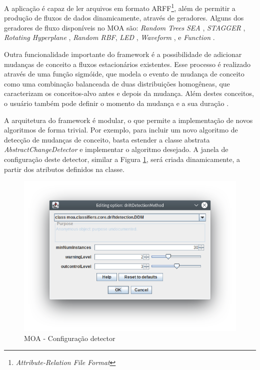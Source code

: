 \documentclass[msc, classic, a4paper]{ufbathesis}
\begin{document}
A aplicação é capaz de ler arquivos em formato ARFF\footnote{\textit{Attribute-Relation File Format}}, além de permitir a produção de fluxos de dados dinamicamente, através de geradores.
Alguns dos geradores de fluxo disponíveis no MOA são:
\textit{Random Trees} \cite{Domingos:2000:MHD:347090.347107}
\textit{SEA} \cite{Street:2001:SEA:502512.502568},
\textit{STAGGER} \cite{Schlimmer1986},
\textit{Rotating Hyperplane} \cite{Wang:2003:MCD:956750.956778},
\textit{Random RBF},
\textit{LED} \cite{Gama:2003:ADT:956750.956813},
\textit{Waveform} \cite{Gama:2003:ADT:956750.956813},
 e \textit{Function} \cite{Jin:2003:EDT:956750.956821}.

Outra funcionalidade importante do framework é a possibilidade de adicionar mudanças de conceito a fluxos estacionários existentes.
Esse processo é realizado através de uma função sigmóide, que modela o evento de mudança de conceito como uma combinação balanceada de duas distribuições homogêneas,
que caracterizam os conceitos-alvo antes e depois da mudança.
Além destes conceitos, o usuário também pode definir o momento da mudança e a sua duração \cite{Bifet:2010:MMO:1756006.1859903}.

A arquitetura do framework é modular, o que permite a implementação de novos algoritmos de forma trivial.
Por exemplo, para incluir um novo algoritmo de detecção de mudanças de conceito, basta estender a classe abstrata \textit{AbstractChangeDetector} e implementar o algoritmo desejado.
A janela de configuração deste detector, similar a Figura \ref{fig:moa_detector}, será criada dinamicamente, a partir dos atributos definidos na classe.

\begin{figure}[H]
\begin{center}
    \includegraphics[scale=1]{imagens/detector.png}
    \caption{MOA - Configuração detector}
    \label{fig:moa_detector}
\end{center}
\end{figure}
\end{document}
